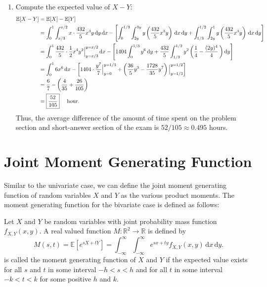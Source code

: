 \begin{solution}
\begin{enumerate}
        \item Compute the expected value of $X - Y$:
        \begin{align*}
            \mathbb{E}[X - Y] &= \mathbb{E}[X] - \mathbb{E}[Y]\\
            &= \int^1_0 \int^{x/2}_{x/3} x \cdot \frac{432}{5} x^3 y \, \mathrm{d}y \, \mathrm{d}x - 
            \left[ \int_{0}^{1/3} \int^{3y}_{2y} y \left( \frac{432}{5} x^3 y \right) \, \mathrm{d}x \, \mathrm{d}y 
            + \int_{1/3}^{1/2} \int_{2y}^{1} y \left( \frac{432}{5} x^3 y \right) \, \mathrm{d}x \, \mathrm{d}y \right]\\
            &= \int^1_0 \frac{432}{5} \cdot \frac{1}{2}x^4 y^2 \Big|^{y=x/2}_{y=x/3} \, \mathrm{d}x - \left[
                1404 \int^{1/3}_{0} y^6 \, \mathrm{d}y + \frac{432}{5} \int_{1/3}^{1/2} y^2 \left( \frac{1}{4} - \frac{(2y)^4}{4} \,  \right)\mathrm{d}y
            \right]\\
            &= \int_{0}^{1} 6x^6 \, \mathrm{d}x - \left[
                1404 \cdot \frac{y^7}{7} \Big|^{y=1/3}_{y=0} + \left( \frac{36}{5}y^3 - \frac{1728}{35}y^7 \right) \Big|^{y=1/2}_{y=1/3}
            \right]\\
            &= \frac{6}{7} - \left(\frac{4}{35} + \frac{26}{105}\right)\\ 
            &= \fbox{$\displaystyle \frac{52}{105}$} \quad \text{ hour}.
        \end{align*}
        Thus, the average difference of the amount of time spent on the problem section and short-answer section of the exam is
        $52 / 105 \approx 0.495$ hours.
    \end{enumerate}
\end{solution}

\section{Joint Moment Generating Function}

Similar to the univariate case, we can define the joint moment generating function of random variables $X$ and $Y$ as
the various product moments. The moment generating function for the 
bivariate case is defined as follows:

\begin{definition}
    Let $X$ and $Y$ be random variables with joint probability mass function $f_{X,Y}(x,y)$.
    A real valued function $M : \mathbb{R}^2 \to \mathbb{R}$ is defined by 
    \begin{equation}
        M(s, t) = \mathbb{E}[e^{s X + t Y}] = \int_{-\infty}^{\infty} \int_{-\infty}^{\infty} e^{s x + t y} f_{X,Y}(x,y) \, \mathrm{d}x \, \mathrm{d}y.
    \end{equation}
    is called the moment generating function of $X$ and $Y$ if the expected value 
    exists for all $s$ and $t$ in some interval $-h < s < h$ and for all $t$ in some 
    interval $-k < t < k$ for some positive $h$ and $k$.
\end{definition}


